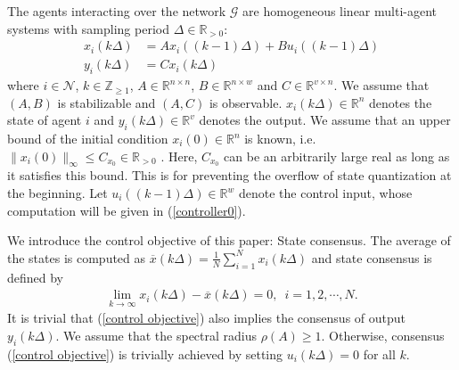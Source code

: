 \documentclass[letterpaper,journal,final,twocolumn]{IEEEtran}
\begin{document}
The agents interacting over the network $\mathcal{G}$ are homogeneous linear multi-agent systems with sampling period $\Delta \in \mathbb{R}_{>0} $:
\begin{subequations}\label{system}
\begin{align}
x_i(k\Delta) &= A x_i((k-1)\Delta) +B u_i((k-1)\Delta) \\
y_i(k\Delta)&= C x_i(k\Delta)
\end{align}
\end{subequations}
where $i \in \mathcal N$, $k\in \mathbb{Z}_{\ge 1}$, $A\in \mathbb R^{n \times n}$, $B\in \mathbb R^{n \times w}$ and $C\in \mathbb R^{v\times n}$. We assume that $(A,B)$ is stabilizable and $(A,C)$ is  observable. 
$x_i(k \Delta)\in \mathbb{R}^{n}$ denotes the state of agent $i$ and $y_i(k \Delta)\in \mathbb{R}^{v}$ denotes the output. We assume that an upper bound of the initial condition $x_i(0) \in  \mathbb{R}^{n}$ is known, i.e. $\| x_i(0)\|_\infty \le C_{x_0} \in \mathbb{R}_{>0}$ \cite{you2011network, li2010distributed, 9429920}. 
Here, $C_{x_0}$ can be an arbitrarily large real as long as it satisfies this bound. This is for preventing the overflow of state quantization at the beginning.
Let $u_i((k-1)\Delta) \in \mathbb{R}^{w}$ denote the control input, whose computation will be given in (\ref{controller0}). 


We introduce the control objective of this paper: State consensus. The average of the states is computed as
$
\overline{x}(k\Delta) = \frac{1}{N}\sum_{i=1}^N x_i(k\Delta) 
$
and state consensus is defined by 
\begin{align}\label{control objective}
\lim_{k  \to \infty }   x_i(k\Delta) - \overline  x(k\Delta)    = 0, \,\,\, i=1,2,\cdots, N.
\end{align}
It is trivial that (\ref{control objective}) also implies the consensus of output $y_i(k\Delta)$. We assume that the spectral radius $\rho(A) \ge 1$. Otherwise, consensus (\ref{control objective}) is trivially achieved by setting $u_i(k\Delta)=0$ for all $k$.
\end{document}
